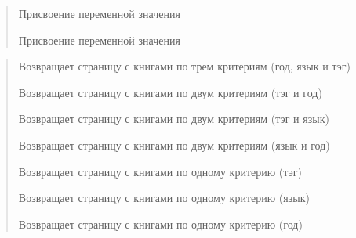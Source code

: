 \documentclass[letterpaper,10pt,russian]{sphinxmanual}
\begin{document}
\begin{fulllineitems}
\begin{description}
\begin{quote}
\begin{description}
\sphinxAtStartPar
Присвоение переменной значения

\sphinxAtStartPar
Присвоение переменной значения

\end{description}\end{quote}

\begin{quote}\begin{description}
\sphinxAtStartPar
Возвращает страницу с книгами по трем критериям (год, язык и тэг)

\sphinxAtStartPar
Возвращает страницу с книгами по двум критериям (тэг и год)

\sphinxAtStartPar
Возвращает страницу с книгами по двум критериям (тэг и язык)

\sphinxAtStartPar
Возвращает страницу с книгами по двум критериям (язык и год)

\sphinxAtStartPar
Возвращает страницу с книгами по одному критерию (тэг)

\sphinxAtStartPar
Возвращает страницу с книгами по одному критерию (язык)

\sphinxAtStartPar
Возвращает страницу с книгами по одному критерию (год)

\end{description}\end{quote}

\end{description}

\end{fulllineitems}

\end{document}
